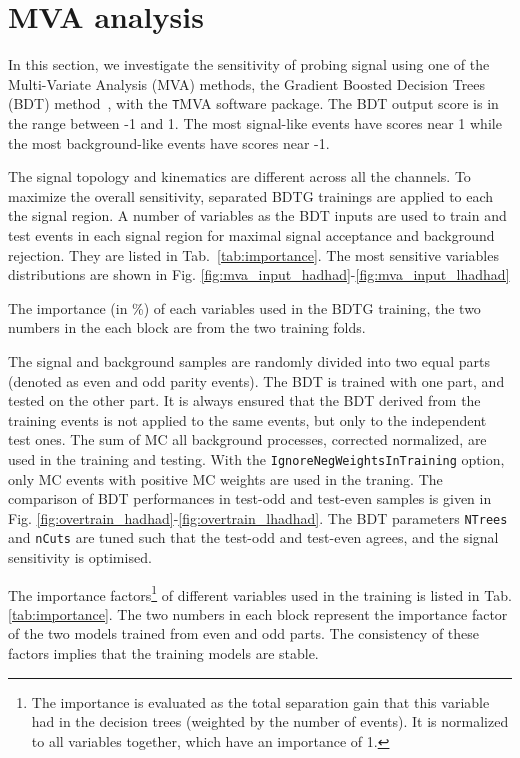 \section{MVA analysis}
\label{sec:mva}

In this section, we investigate the sensitivity of probing signal using one of the Multi-Variate Analysis (MVA) methods, the Gradient Boosted Decision Trees (BDT) method~\cite{BDT,BDT2}, with the {\texttt TMVA} software package. The BDT output score is in the range between -1 and 1. The most signal-like events have scores near 1 while the most background-like events have scores near -1.

The signal topology and kinematics are different across all the channels. To maximize the overall sensitivity, separated BDTG trainings are applied to each the signal region. A number of variables as the BDT inputs are used to train and test events in each signal region for maximal signal acceptance and background rejection. They are listed in Tab.~\ref{tab:importance}. The most sensitive variables distributions are shown in Fig. \ref{fig:mva_input_hadhad}-\ref{fig:mva_input_lhadhad}

\begin{table}
\label{tab:importance}
\caption{The importance (in \%) of each variables used in the BDTG training, the two numbers in the each block are from the two training folds.}

\end{table}

The signal and background samples are randomly divided into two equal parts (denoted as even and odd parity events). The BDT is trained with one part, and tested on the other part. It is always ensured that the BDT derived from the training events is not applied to the same events, but only to the independent test ones. The sum of MC all background processes, corrected normalized, are used in the training and testing. %
With the \texttt{IgnoreNegWeightsInTraining} option, only MC events with positive MC weights are used in the traning. The comparison of BDT performances in test-odd and test-even samples is given in Fig. \ref{fig:overtrain_hadhad}-\ref{fig:overtrain_lhadhad}. The BDT parameters \texttt{NTrees} and \texttt{nCuts} are tuned such that the test-odd and test-even agrees, and the signal sensitivity is optimised.

The importance factors\footnote{
The importance is evaluated as the total separation gain that this variable had in the decision trees (weighted by the number of events). It is normalized to all variables together, which have an importance of 1.
}
of different variables used in the training is listed in Tab. \ref{tab:importance}. The two numbers in each block represent the importance factor of the two models trained from even and odd parts. The consistency of these factors implies that the training models are stable.


